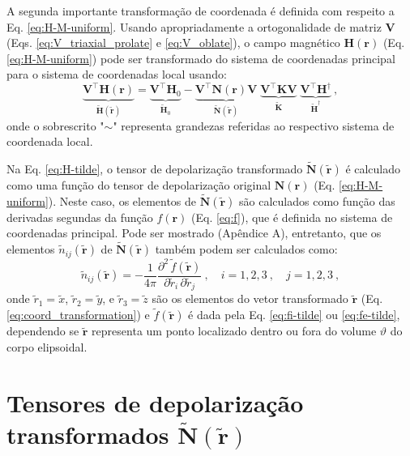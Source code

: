 A segunda importante transformação de coordenada é definida com respeito a Eq. \ref{eq:H-M-uniform}. Usando apropriadamente a ortogonalidade de matriz $\mathbf{V}$ (Eqs. \ref{eq:V_triaxial_prolate} e \ref{eq:V_oblate}),
o campo magnético $\mathbf{H}(\mathbf{r})$ (Eq. \ref{eq:H-M-uniform}) pode ser transformado do sistema de coordenadas principal para o sistema de coordenadas local usando:
\begin{equation}
\underbrace{\mathbf{V}^{\top} \mathbf{H}(\mathbf{r})}_{\tilde{\mathbf{H}}(\tilde{\mathbf{r}})} = 
\underbrace{\mathbf{V}^{\top} \mathbf{H}_{0}}_{\tilde{\mathbf{H}}_{0}}
- \underbrace{\mathbf{V}^{\top} \mathbf{N}(\mathbf{r}) \mathbf{V}}
_{\tilde{\mathbf{N}}(\tilde{\mathbf{r}})} \;
\underbrace{\mathbf{V}^{\top} \mathbf{K} \mathbf{V}}
_{\tilde{\mathbf{K}}} \; 
\underbrace{\mathbf{V}^{\top} \mathbf{H}^{\dagger}}
_{\tilde{\mathbf{H}}^{\dagger}} \: ,
\label{eq:H-tilde}
\end{equation}
onde o sobrescrito "$\sim$" representa grandezas referidas ao respectivo sistema de coordenada local.

Na Eq. \ref{eq:H-tilde}, o tensor de depolarização transformado $\tilde{\mathbf{N}}(\tilde{\mathbf{r}})$ é calculado como uma função do tensor de depolarização original $\mathbf{N}(\mathbf{r})$ (Eq. \ref{eq:H-M-uniform}). Neste caso, os elementos de $\tilde{\mathbf{N}}(\tilde{\mathbf{r}})$ são calculados como função das derivadas segundas da função $f(\mathbf{r})$ (Eq. \ref{eq:f}), que é definida no  sistema de coordenadas principal. Pode ser mostrado (Apêndice A), entretanto, que os elementos $\tilde{n}_{ij}(\tilde{\mathbf{r}})$ de
$\tilde{\mathbf{N}}(\tilde{\mathbf{r}})$ também podem ser calculados como:
\begin{equation}
\tilde{n}_{ij}(\tilde{\mathbf{r}}) = - 
\frac{1}{4\pi} \frac{\partial^{2} \, \tilde{f}(\tilde{\mathbf{r}})}
{\partial \tilde{r}_{i} \, \partial \tilde{r}_{j}} 
\: , \quad i = 1, 2, 3 \: , \quad j = 1, 2, 3 \: ,
\label{eq:nij-tilde}
\end{equation}
onde $\tilde{r}_{1} = \tilde{x}$, $\tilde{r}_{2} = \tilde{y}$, 
e $\tilde{r}_{3} = \tilde{z}$ são os elementos do vetor transformado $\tilde{\mathbf{r}}$ (Eq. \ref{eq:coord_transformation})
e $\tilde{f}(\tilde{\mathbf{r}})$ é dada pela Eq. \ref{eq:fi-tilde}
ou \ref{eq:fe-tilde}, dependendo se $\tilde{\mathbf{r}}$ representa um ponto localizado dentro ou fora do volume $\vartheta$ do corpo elipsoidal.

\section{Tensores de depolarização transformados $\tilde{\mathbf{N}}(\tilde{\mathbf{r}})$}

